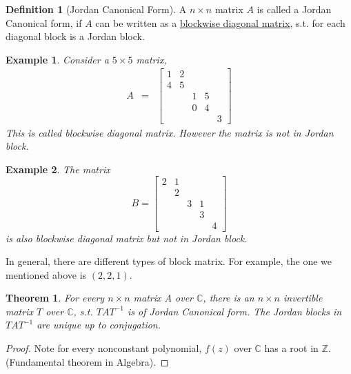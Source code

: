 \documentclass{article}
\theoremstyle{MyNonumberplain}
\theoremstyle{break}
\newtheorem*{proof}{Proof. }
\theoremstyle{break}
\newtheorem{theorem}{Theorem}[section]
\newtheorem{example}{Example}[section]
\theoremstyle{break}
\theoremstyle{definition}
\theoremstyle{break}
\newtheorem{definition}{Definition}[section]
\begin{document}
\begin{defbox}
    \begin{definition}[Jordan Canonical Form]
        A $n \times n$ matrix $A$ is called a Jordan Canonical form, if $A$ can be
        written as a {\underline{blockwise diagonal matrix}}, s.t. for each diagonal
        block is a Jordan block.
    \end{definition}
\end{defbox}

\begin{expbox}
    \begin{example}
        Consider a $5 \times 5$ matrix,
        \begin{eqnarray*}
          A & = & \left[\begin{array}{ccccc}
            1 & 2 &  &  & \\
            4 & 5 &  &  & \\
            &  & 1 & 5 & \\
            &  & 0 & 4 & \\
            &  &  &  & 3
          \end{array}\right]
        \end{eqnarray*}
        This is called blockwise diagonal matrix. However the matrix is not in Jordan
        block.
    \end{example}
\end{expbox}

\begin{expbox}
    \begin{example}
        The matrix
        \[ B = \left[\begin{array}{ccccc}
             2 & 1 &  &  & \\
             & 2 &  &  & \\
             &  & 3 & 1 & \\
             &  &  & 3 & \\
             &  &  &  & 4
           \end{array}\right] \]
        is also blockwise diagonal matrix but not in Jordan block.
    \end{example}
    In general, there are different types of block matrix. For example, the one we mentioned above is $(2,2,1)$.
\end{expbox}


\begin{thmbox}
    \begin{theorem}
        For every $n \times n$ matrix $A$ over $\mathbb{C}$, there is an $n \times n$
        invertible matrix $T$ over $\mathbb{C}$, s.t. $T A T^{- 1}$ is of Jordan
        Canonical form. The Jordan blocks in $T A T^{- 1}$ are unique up to
        conjugation.
    \end{theorem}
    \begin{prfbox}
        \begin{proof}
            Note for every nonconstant polynomial, $f (z)$ over $\mathbb{C}$ has a root in
            $\mathbb{Z}$. (Fundamental theorem in Algebra).
        \end{proof}
    \end{prfbox}
\end{thmbox}
\end{document}
